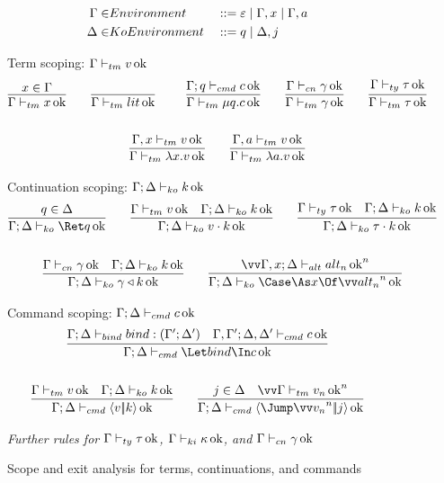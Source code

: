 \documentclass{article}
\begin{document}
\begin{figure}
\centering
\begin{gather*}
\begin{aligned}
  \Gamma \in& Environment
  &
  &::= \varepsilon
  \mid \Gamma, x
  \mid \Gamma, a
  \\
  \Delta \in& KoEnvironment
  &
  &::= q
  \mid \Delta, j
\end{aligned}
\end{gather*}

Term scoping: $\Gamma \vdash_{tm} v \operatorname{ok}$
\begin{gather*}
  \infer
  {\scopetm{\Gamma}{x}}
  {x \in \Gamma}
  \qquad
  \axiom{\scopetm{\Gamma}{\lit}}
  \qquad
  \infer
  {\scopetm{\Gamma}{\compute q \cmd}}
  {\scopecmd{\Gamma}{q}{\cmd}}
  \qquad
  \infer
  {\scopetm{\Gamma}{\cn}}
  {\scopecn{\Gamma}{\cn}}
  \qquad
  \infer
  {\scopetm{\Gamma}{\ty}}
  {\scopety{\Gamma}{\ty}}
  \\\\
  \infer
  {\scopetm{\Gamma}{\fn x \tm}}
  {\scopetm{\Gamma, x}{\tm}}
  \qquad
  \infer
  {\scopetm{\Gamma}{\fn a \tm}}
  {\scopetm{\Gamma, a}{\tm}}
\end{gather*}

Continuation scoping: $\Gamma; \Delta \vdash_{ko} k \operatorname{ok}$
\begin{gather*}
  \infer
  {\scopeko{\Gamma}{\Delta}{\ret q}}
  {q \in \Delta}
  \qquad
  \infer
  {\scopeko{\Gamma}{\Delta}{\app{\tm}{\ko}}}
  {
    \scopetm{\Gamma}{\tm}
    &
    \scopeko{\Gamma}{\Delta}{\ko}
  }
  \qquad
  \infer
  {\scopeko{\Gamma}{\Delta}{\app{\ty}{\ko}}}
  {
    \scopety{\Gamma}{\ty}
    &
    \scopeko{\Gamma}{\Delta}{\ko}
  }
  \\\\
  \infer
  {\scopeko{\Gamma}{\Delta}{\koerce{\cn}{\ko}}}
  {
    \scopecn{\Gamma}{\cn}
    &
    \scopeko{\Gamma}{\Delta}{\ko}
  }
  \qquad
  \infer
  {\scopeko{\Gamma}{\Delta}{\caseas{x}{\vect[n]{\analt_n}}}}
  {
    \vect[n]{
      \scopealt{\Gamma, x}{\Delta}{\analt_n}
    }
  }
\end{gather*}

Command scoping: $\Gamma; \Delta \vdash_{cmd} c \operatorname{ok}$
\begin{gather*}
  \infer
  {\scopecmd{\Gamma}{\Delta}{\Let \abind \In \cmd}}
  {
    \scopebind{\Gamma}{\Delta}{\abind}{\Gamma'}{\Delta'}
    &
    \scopecmd{\Gamma,\Gamma'}{\Delta,\Delta'}{\cmd}
  }
  \\\\
  \infer
  {\scopecmd{\Gamma}{\Delta}{\cut{\tm}{\ko}}}
  {
    \scopetm{\Gamma}{\tm}
    &
    \scopeko{\Gamma}{\Delta}{\ko}
  }
  \qquad
  \infer
  {\scopecmd{\Gamma}{\Delta}{\jump{\vect[n]{\tm_n}}{j}}}
  {
    j \in \Delta
    &
    \vect[n]{
      \scopetm{\Gamma}{\tm_n}
    }
  }
\end{gather*}


\emph{Further rules for $\Gamma \vdash_{ty} \tau \operatorname{ok}$, $\Gamma \vdash_{ki} \kappa \operatorname{ok}$, and
  $\Gamma \vdash_{cn} \gamma \operatorname{ok}$}
\caption{Scope and exit analysis for terms, continuations, and commands}
\label{fig:scoping-rules}
\end{figure}
\end{document}
